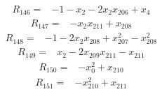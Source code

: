 {%
\begin{align*}
R_{146} ={}& -1 - x_{2} - 2x_{2} x_{206} + x_{4}
\end{align*}
\begin{align*}
R_{147} ={}& -x_{2} x_{211} + x_{208}
\end{align*}
\begin{align*}
R_{148} ={}& -1 - 2x_{2} x_{208} + x_{207}^{2} - x_{208}^{2}
\end{align*}
\begin{align*}
R_{149} ={}& x_{2} - 2x_{209} x_{211} - x_{211}
\end{align*}
\begin{align*}
R_{150} ={}& -x_{0}^{2} + x_{210}
\end{align*}
\begin{align*}
R_{151} ={}& -x_{210}^{2} + x_{211}
\end{align*}
}
